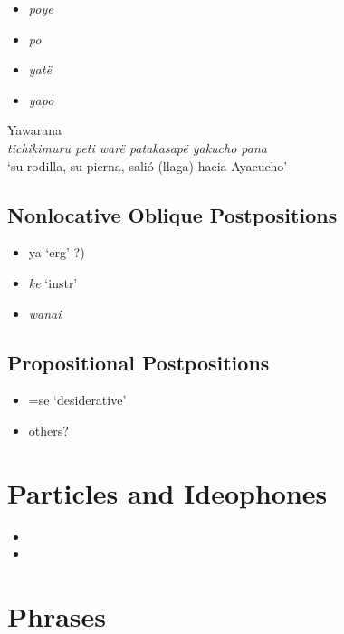 \documentclass{memoir}
\begin{document}
\begin{itemize}
\tightlist
\item
  \emph{poye}
\item
  \emph{po}
\item
  \emph{yatë}
\item
  \emph{yapo}
\end{itemize}

\ex Yawarana \\
\label{histpajirdi-186}    \textit{tichikimuru peti warë patakasapë yakucho pana }\\
        ‘su rodilla, su pierna, salió (llaga) hacia Ayacucho’ \xe

\section{Nonlocative Oblique Postpositions}

\begin{itemize}
\tightlist
\item
   ya `erg' ?)
\item
  \emph{ke} `instr'
\item
  \emph{wanai}
\end{itemize}

\section{Propositional Postpositions}

\begin{itemize}
\tightlist
\item
  =se `desiderative'
\item
  others?
\end{itemize}

\chapter{\texorpdfstring{Particles and Ideophones
\label{partideo}}{Particles and Ideophones }}

\begin{itemize}
\tightlist
\item
\item
\end{itemize}

\chapter{\texorpdfstring{Phrases \label{phrases}}{Phrases }}
\end{document}
